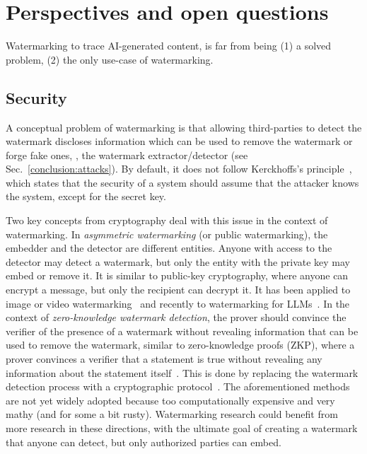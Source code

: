 \section{Perspectives and open questions}

Watermarking to trace AI-generated content, is far from being (1) a solved problem, (2) the only use-case of watermarking.

\subsection{Security}
A conceptual problem of watermarking is that allowing third-parties to detect the watermark discloses information which can be used to remove the watermark or forge fake ones, \eg, the watermark extractor/detector (see Sec.~\ref{conclusion:attacks}).
By default, it does not follow Kerckhoffs's principle~\citep{Kerckhoffs1883}, which states that the security of a system should assume that the attacker knows the system, except for the secret key.

Two key concepts from cryptography deal with this issue in the context of watermarking.
In \emph{asymmetric watermarking} (or public watermarking), the embedder and the detector are different entities.
Anyone with access to the detector may detect a watermark, but only the entity with the private key may embed or remove it.
It is similar to public-key cryptography, where anyone can encrypt a message, but only the recipient can decrypt it.
It has been applied to image or video watermarking~\citep{furon1999asymmetric, furon2003asymmetric, hartung1997fast} and recently to watermarking for LLMs~\citep{fairoze2023publicly}.
In the context of \emph{zero-knowledge watermark detection}, the prover should convince the verifier of the presence of a watermark without revealing information that can be used to remove the watermark, similar to zero-knowledge proofs (ZKP), where a prover convinces a verifier that a statement is true without revealing any information about the statement itself~\citep{fiege1987zero}.
This is done by replacing the watermark detection process with a cryptographic protocol~\citep{craver2000zero, adelsbach2001zero, adelsbach2003watermark}.
The aforementioned methods are not yet widely adopted because too computationally expensive and very mathy (and for some a bit rusty).
Watermarking research could benefit from more research in these directions, with the ultimate goal of creating a watermark that anyone can detect, but only authorized parties can embed.

